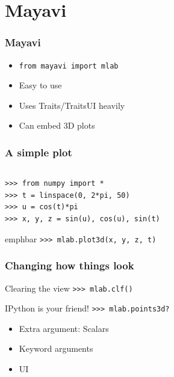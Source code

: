 \documentclass[14pt,compress]{beamer}
\newcommand{\emphbar}[1]
{\begin{beamercolorbox}[rounded=true]{emphbar} 
      {#1}
 \end{beamercolorbox}
}
\newcommand{\typ}[1]{\lstinline{#1}}
\newcommand{\myemph}[1]{\structure{\emph{#1}}}
\newcommand{\PythonCode}[1]{\lstinline{#1}}
\begin{document}
\section{Mayavi}

\begin{frame}
  \frametitle{Mayavi}
  \begin{itemize}
      \item \typ{from mayavi import mlab}
      \item Easy to use
      \item Uses Traits/TraitsUI heavily
      \item Can embed 3D plots
 \end{itemize}
\end{frame}

\begin{frame}
    \frametitle{A simple plot}
    \begin{columns}
        \myemph{\Large 1D data}

    \end{columns}

    \begin{lstlisting}
>>> from numpy import *
>>> t = linspace(0, 2*pi, 50)
>>> u = cos(t)*pi
>>> x, y, z = sin(u), cos(u), sin(t)

    \end{lstlisting}

    \emphbar{\PythonCode{>>> mlab.plot3d(x, y, z, t)}}
\end{frame}


\begin{frame}
    \frametitle{Changing how things look}

    \begin{block}{Clearing the view}
    \typ{>>> mlab.clf()}
    \end{block}

    \pause

    \begin{block}{IPython is your friend!}
    \PythonCode{>>> mlab.points3d?}

    \begin{itemize}

        \item Extra argument: Scalars

        \item Keyword arguments

        \item UI
    \end{itemize}
    \end{block}
\end{frame}
\end{document}
